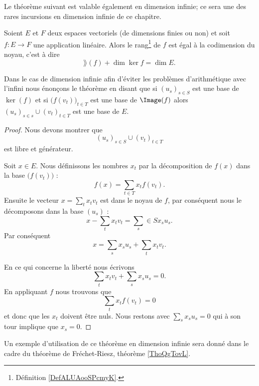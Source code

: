 Le théorème suivant est valable également en dimension infinie; ce sera une des rares incursions en dimension infinie de ce chapitre.
\begin{theorem}       \label{ThoGkkffA}
    Soient \( E\) et \( F\) deux espaces vectoriels (de dimensions finies ou non) et soit \( f\colon E\to F\) une application linéaire. Alors le rang\footnote{Définition \ref{DefALUAooSPcmyK}.} de \( f\) est égal à la codimension du noyau, c'est à dire
       \begin{equation}
           \rang(f)+\dim\ker f=\dim E.
       \end{equation}

       Dans le cas de dimension infinie afin d'éviter les problèmes d'arithmétique avec l'infini nous énonçons le théorème en disant que si \( (u_s)_{s\in S}\) est une base de \( \ker(f)\) et si \( \big( f(v_t) \big)_{t\in T}\) est une base de \( \Image(f)\) alors  \( (u_s)_{s\in s}\cup (v_t)_{t\in T}\) est une base de \( E\).
\end{theorem}

\begin{proof}
    Nous devons montrer que 
    \begin{equation}
          (u_s)_{s\in S}\cup (v_t)_{t\in T}
    \end{equation}
    est libre et générateur.

    Soit \( x\in E\). Nous définissons les nombres \( x_t\) par la décomposition de \( f(x)\) dans la base \( \big( f(v_t) \big)\) :
    \begin{equation}
        f(x)=\sum_{t\in T}x_tf(v_t).
    \end{equation}
    Ensuite le vecteur \( x=\sum_tx_tv_t\) est dans le noyau de \( f\), par conséquent nous le décomposons dans la base \( (u_s)\) :
    \begin{equation}
        x-\sum_tx_tv_t=\sum_s\in S x_su_s.
    \end{equation}
    Par conséquent
    \begin{equation}
        x=\sum_sx_su_s+\sum_tx_tv_t.
    \end{equation}
    
    En ce qui concerne la liberté nous écrivons
    \begin{equation}
        \sum_tx_tv_t+\sum_sx_su_s=0.
    \end{equation}
    En appliquant \( f\) nous trouvons que 
    \begin{equation}
        \sum_tx_tf(v_t)=0
    \end{equation}
    et donc que les \( x_t\) doivent être nuls. Nous restons avec \( \sum_sx_su_s=0\) qui à son tour implique que \( x_s=0\).
\end{proof}
Un exemple d'utilisation de ce théorème en dimension infinie sera donné dans le cadre du théorème de Fréchet-Riesz, théorème \ref{ThoQgTovL}.

